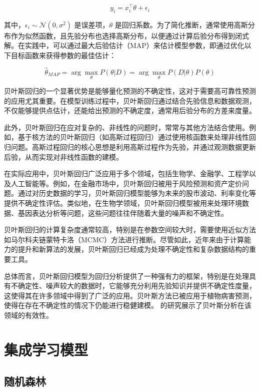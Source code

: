 \documentclass[AutoFakeBold]{LZUThesis-PgD&PhD}
\begin{document}
	\[
	y_i = x_i^\top \theta + \epsilon_i
	\]
	
	其中，$\epsilon_i \sim \mathcal{N}(0, \sigma^2)$ 是误差项，$\theta$ 是回归系数。为了简化推断，通常使用高斯分布作为似然函数，且先验分布也选择高斯分布，以便通过计算后验分布得到闭式解。在实践中，可以通过最大后验估计（MAP）来估计模型参数，即通过优化以下目标函数来获得参数的最佳估计：
	
	\[
	\hat{\theta}_{MAP} = \arg\max_\theta P(\theta | D) = \arg\max_\theta P(D | \theta) P(\theta)
	\]
	
	贝叶斯回归的一个显著优势是能够量化预测的不确定性，这对于需要高可靠性预测的应用尤其重要。在模型训练过程中，贝叶斯回归通过结合先验信息和数据观测，不仅能够提供点估计，还能给出预测的不确定度，通常用后验分布的方差来度量。
	
	此外，贝叶斯回归在应对复杂的、非线性的问题时，常常与其他方法结合使用。例如，基于核方法的贝叶斯回归（如高斯过程回归）通过使用核函数来处理非线性回归问题。高斯过程回归的核心思想是利用高斯过程作为先验，并通过观测数据更新后验，从而实现对非线性函数的建模。
	
	在实际应用中，贝叶斯回归广泛应用于多个领域，包括生物学、金融学、工程学以及人工智能等。例如，在金融市场中，贝叶斯回归被用于风险预测和资产定价问题。通过对历史数据的学习，贝叶斯回归模型能够为未来的股市波动、利率变化等提供不确定性评估。类似地，在生物学领域，贝叶斯回归模型被用来处理环境数据、基因表达分析等问题，这些问题往往伴随着大量的噪声和不确定性。
	
	贝叶斯回归的计算复杂度通常较高，特别是在参数空间较大时，需要使用近似方法如马尔科夫链蒙特卡洛（MCMC）方法进行推断。尽管如此，近年来由于计算能力的提升和新算法的发展，贝叶斯回归已经成为处理不确定性和复杂数据结构的重要工具。
	
	总体而言，贝叶斯回归模型为回归分析提供了一种强有力的框架，特别是在处理具有不确定性、噪声较大的数据时，它能够充分利用先验知识并提供不确定性度量，这使得其在许多领域中得到了广泛的应用。贝叶斯方法已被应用于植物病害预测，使得在存在不确定性的情况下仍能进行稳健建模。\citet{yuen2002bayesian} 的研究展示了贝叶斯分析在该领域的有效性。
	
	\section{集成学习模型}
	
	\subsection{随机森林}
	
\end{document}
